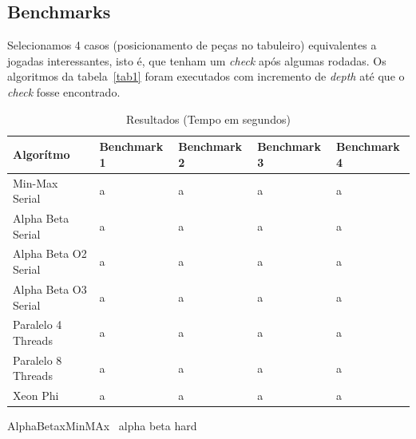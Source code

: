 \documentclass[12pt,a4paper,final]{article}
\begin{document}
\subsection{Benchmarks}

Selecionamos 4 casos (posicionamento de peças no tabuleiro) equivalentes a jogadas interessantes, isto é, que tenham um \textit{check} após algumas rodadas. Os algoritmos da tabela~\ref{tab1} foram executados com incremento de \textit{depth} até que o \textit{check} fosse encontrado.

\begin{table}[h]
	\label{tab1}
	\centering
	\caption{Resultados (Tempo em segundos)}
	\label{my-label}
	\begin{tabular}{|l|l|l|l|l|}
		\hline
		Algorítmo            & Benchmark 1 & Benchmark 2 & Benchmark 3 & Benchmark 4 \\ \hline
		Min-Max Serial       & a           & a           & a           & a           \\ \hline
		Alpha Beta Serial    & a           & a           & a           & a           \\ \hline
		Alpha Beta O2 Serial & a           & a           & a           & a           \\ \hline
		Alpha Beta O3 Serial & a           & a           & a           & a           \\ \hline
		Paralelo 4 Threads   & a           & a           & a           & a           \\ \hline
		Paralelo 8 Threads   & a           & a           & a           & a           \\ \hline
		Xeon Phi             & a           & a           & a           & a           \\ \hline
	\end{tabular}
\end{table}

AlphaBetaxMinMAx~\cite{chess2}
alpha beta hard~\cite{chess1}

%  


\end{document}
